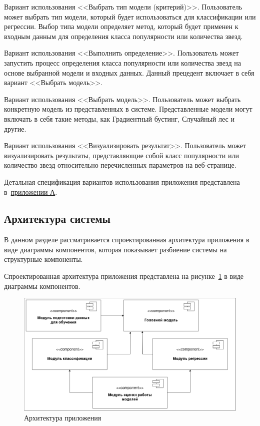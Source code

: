 \begin{enumerateparendot}
    \item Вариант использования <<Выбрать тип модели (критерий)>>. Пользователь может выбрать тип модели, который будет использоваться для классификации или регрессии. Выбор типа модели определяет метод, который будет применен к входным данным для определения класса популярности или количества звезд.
    
    \item Вариант использования <<Выполнить определение>>. Пользователь может запустить процесс определения класса популярности или количества звезд на основе выбранной модели и входных данных. Данный прецедент включает в себя вариант <<Выбрать модель>>.

    \item Вариант использования <<Выбрать модель>>. Пользователь может выбрать конкретную модель из представленных в системе. Представленные модели могут включать в себя такие методы, как Градиентный бустинг, Случайный лес и другие. 

    \item Вариант использования <<Визуализировать результат>>. Пользователь может визуализировать результаты, представляющие собой класс популярности или количество звезд относительно перечисленных параметров на веб-странице. 
\end{enumerateparendot}

Детальная спецификация вариантов использования приложения представлена в~\hyperref[sec:specification]{приложении А}.
\vspace{1em}

\subsection{Архитектура системы}
\label{sec:Architecture}
В данном разделе рассматривается спроектированная архитектура приложения в виде диаграммы компонентов, которая показывает разбиение системы на структурные компоненты.

Спроектированная архитектура приложения представлена на рисунке~\ref{ris:architecture} в виде диаграммы компонентов.

\begin{figure}[h]
    \centering
    \includegraphics[width=1\linewidth]{pic/architecture.png}
    \vspace{-1em}\caption{Архитектура приложения}
    \label{ris:architecture}
\end{figure}
\vspace{1em}

